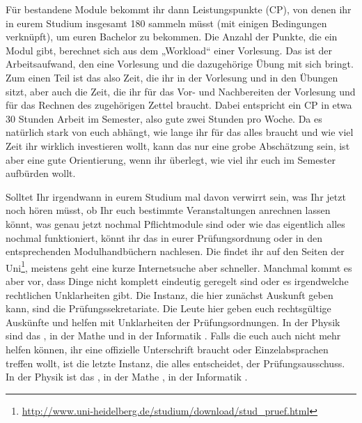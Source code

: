 Für bestandene Module bekommt ihr dann Leistungspunkte (\gls{CP}), von denen ihr in eurem Studium insgesamt 180 sammeln müsst (mit einigen Bedingungen verknüpft), um euren Bachelor zu bekommen. Die Anzahl der Punkte, die ein Modul gibt, berechnet sich aus dem „Workload“ einer Vorlesung. Das ist der Arbeitsaufwand, den eine Vorlesung und die dazugehörige Übung mit sich bringt. Zum einen Teil ist das also Zeit, die ihr in der Vorlesung und in den Übungen sitzt, aber auch die Zeit, die ihr für das Vor- und Nachbereiten der Vorlesung und für das Rechnen des zugehörigen Zettel braucht. Dabei entspricht ein \gls{CP} in etwa 30 Stunden Arbeit im Semester, also gute zwei Stunden pro Woche. Da es natürlich stark von euch abhängt, wie lange ihr für das alles braucht und wie viel Zeit ihr wirklich investieren wollt, kann das nur eine grobe Abschätzung sein, ist aber eine gute Orientierung, wenn ihr überlegt, wie viel ihr euch im Semester aufbürden wollt.

Solltet Ihr irgendwann in eurem Studium mal davon verwirrt sein, was Ihr jetzt noch hören müsst, ob Ihr euch bestimmte Veranstaltungen anrechnen lassen könnt, was genau jetzt nochmal Pflichtmodule sind oder wie das eigentlich alles nochmal funktioniert, könnt ihr das in eurer Prüfungsordnung oder in den entsprechenden Modulhandbüchern nachlesen. Die findet ihr auf den Seiten der Uni\footnote{\url{http://www.uni-heidelberg.de/studium/download/stud_pruef.html}}, meistens geht eine kurze Internetsuche aber schneller. Manchmal kommt es aber vor, dass Dinge nicht komplett eindeutig geregelt sind oder es irgendwelche rechtlichen Unklarheiten gibt. Die Instanz, die hier zunächst Auskunft geben kann, sind die Prüfungssekretariate. Die Leute hier geben euch rechtsgültige Auskünfte und helfen mit Unklarheiten der Prüfungsordnungen. In der Physik sind das \pruefsekphysik, in der Mathe \pruefsekmathe und in der Informatik \pruefsekinfo. Falls die euch auch nicht mehr helfen können, ihr eine offizielle Unterschrift braucht oder Einzelabsprachen treffen wollt, ist die letzte Instanz, die alles entscheidet, der Prüfungsausschuss. In der Physik ist das \pruefausschussvorsitzphysik, in der Mathe \pruefausschussvorsitzmathe, in der Informatik \pruefausschussvorsitzinformatik.
